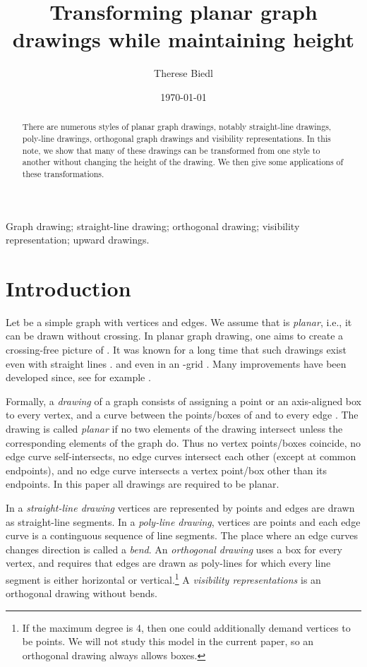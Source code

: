 \documentclass{elsarticle}
\begin{document}
\title{Transforming planar graph drawings while maintaining height
}
\author[uw]{Therese Biedl}
\address[uw]{David R.~Cheriton School of Computer Science, 
University of Waterloo, 
Waterloo, ON N2L 3G1, Canada, {\tt biedl@uwaterloo.ca}}
\date{\today}


\begin{abstract}
There are numerous styles of planar graph drawings,  notably
straight-line drawings, poly-line drawings, orthogonal graph
drawings and visibility representations.  In this note,
we show that many of these drawings can be transformed from
one style to another without changing the height of the drawing.
We then give some applications of these transformations. 
\end{abstract}


\begin{keyword} 
Graph drawing; straight-line drawing; 
orthogonal drawing; visibility representation; upward drawings.
\end{keyword}

\maketitle
\section{Introduction}
\label{se:intro}


Let  be a simple graph with  vertices and
 edges.  We assume that  is {\em planar},
i.e., it can be drawn without crossing.    
In planar graph drawing, one aims to create a crossing-free picture of .
It was known for a long time that such drawings
exist even with straight lines \cite{Wagner36,Fary48,Stein51}.
and even in an -grid \cite{FPP90,Sch90}.
Many improvements have been developed since, see for example
\cite{DBETT98,NR04}.


Formally, 
a {\em drawing} of a graph consists of assigning a point or an axis-aligned
box to every vertex, and a curve between the points/boxes of   and
 to every edge .   The drawing is called {\em planar} if
no two elements of the drawing intersect unless the corresponding elements
of the graph do.  Thus no 
vertex points/boxes coincide, no edge curve
self-intersects, no edge curves intersect each other (except at common
endpoints), and no edge curve intersects a vertex point/box other than 
its endpoints.  In this paper all drawings
are required to be planar.  

In a {\em straight-line drawing} vertices are
represented by points and edges are drawn as straight-line segments.
In a {\em poly-line drawing}, vertices are points and each edge curve is a
continguous sequence of line segments.  The place where an edge curves
changes direction is called a {\em bend}.
An {\em orthogonal drawing} uses a box for every vertex, and
requires that edges are drawn as poly-lines for which every line
segment is either horizontal or vertical.\footnote{If the maximum degree is 4, then one could additionally
demand vertices to be points.  We will not study this model in the
current paper, so an orthogonal drawing always allows boxes.}
A {\em visibility
representations} is an orthogonal drawing without bends.
\end{document}
